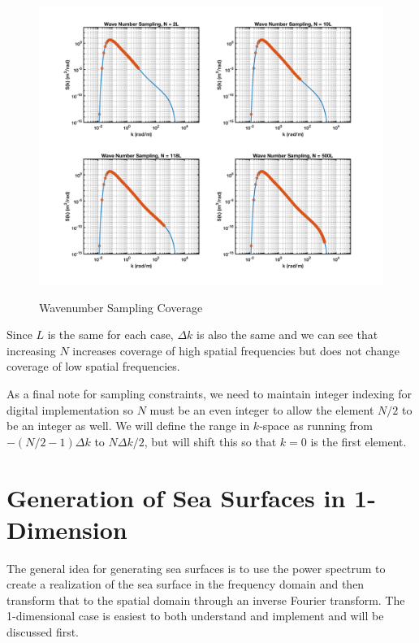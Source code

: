 \begin{figure}[H]
  \begin{center}
\includegraphics[width=6.5in]{../media/Ocean_Surface/sampling_coverage.png}
  \end{center}
  \renewcommand{\baselinestretch}{1} \small\normalsize
  \begin{quote}
    \caption[Wavenumber Sampling Coverage]{Wavenumber Sampling Coverage\label{os_fig:6aa}}
  \end{quote}
\end{figure}
\renewcommand{\baselinestretch}{2} \small\normalsize

Since $L$ is the same for each case, $\Delta k$ is also the same and we can see that increasing $N$ increases coverage of high spatial frequencies but does not change coverage of low spatial frequencies.

As a final note for sampling constraints, we need to maintain integer indexing for digital implementation so $N$ must be an even integer to allow the element $N/2$ to be an integer as well. We will define the range in $k$-space as running from $-\left(N/2-1\right)\Delta k$ to $N\Delta k/2$, but will shift this so that $k = 0 $ is the first element.

\section {Generation of Sea Surfaces in 1-Dimension}\label{os_sec:1d}
The general idea for generating sea surfaces is to use the power spectrum to create a realization of the sea surface in the frequency domain and then transform that to the spatial domain through an inverse Fourier transform. The 1-dimensional case is easiest to both understand and implement and will be discussed first.

